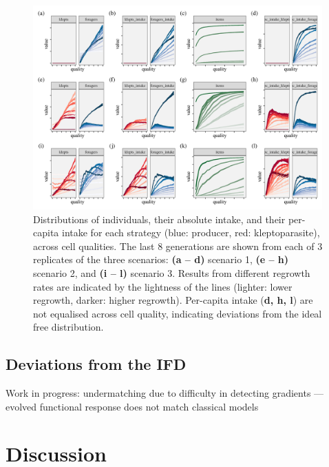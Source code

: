 \documentclass[11pt]{article}
\begin{document}
\begin{figure}[h]
    \includegraphics[width=0.99\textwidth]{figures/fig_06_agent_dist.png}
    \caption{
        Distributions of individuals, their absolute intake, and their per-capita intake for each strategy (blue: producer, red: kleptoparasite), across cell qualities. 
        The last 8 generations are shown from each of 3 replicates of the three scenarios: \textbf{(a -- d)} scenario 1, \textbf{(e -- h)} scenario 2, and \textbf{(i -- l)} scenario 3. Results from different regrowth rates are indicated by the lightness of the lines (lighter: lower regrowth, darker: higher regrowth).
    Per-capita intake (\textbf{d, h, l}) are not equalised across cell quality, indicating deviations from the ideal free distribution.}
\end{figure}

\subsection*{Deviations from the IFD}

Work in progress: undermatching due to difficulty in detecting gradients --- evolved functional response does not match classical models


\section*{Discussion}
\end{document}
